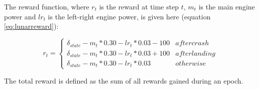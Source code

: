 The reward function, where $r_t$ is the reward at time step $t$, $m_t$ is the main engine power and $lr_t$ is the left-right engine power, is given here (equation \ref{eq:lunarreward}):

\begin{equation}
\label{eq:lunarreward}
    r_t =
    \begin{cases*}
      \delta _{state} - m_t*0.30 - lr_t*0.03 -100  & after crash \\
      \delta _{state} - m_t*0.30 - lr_t*0.03 +100 & after landing \\
      \delta _{state} - m_t*0.30 - lr_t*0.03  & otherwise 
    \end{cases*}
\end{equation}

The total reward is defined as the sum of all rewards gained during an epoch.
